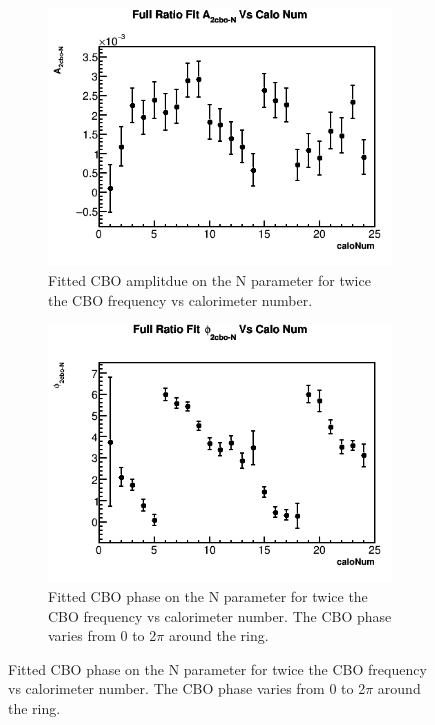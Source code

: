 	\begin{figure}[h]
	\centering
	    \begin{subfigure}[t]{0.4\textwidth}
		    \centering
			\includegraphics[width=\textwidth]{RatioCBOFit_A_2cbo-N_Vs_Calo_Canv}
		    \caption{Fitted CBO amplitdue on the N parameter for twice the CBO frequency vs calorimeter number.}
	    \end{subfigure}
	    \hspace{4mm}
	    \begin{subfigure}[t]{0.4\textwidth}
		    \centering
			\includegraphics[width=\textwidth]{RatioCBOFit_phi_2cbo-N_Vs_Calo_Canv}
		    \caption{Fitted CBO phase on the N parameter for twice the CBO frequency vs calorimeter number. The CBO phase varies from 0 to 2$\pi$ around the ring.}

\end{subfigure}
\end{figure}
